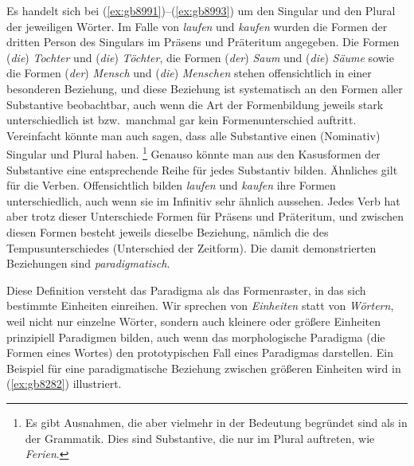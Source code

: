 Es handelt sich bei (\ref{ex:gb8991})--(\ref{ex:gb8993}) um den Singular und den Plural der jeweiligen Wörter.
Im Falle von \textit{laufen} und \textit{kaufen} wurden die Formen der dritten Person des Singulars im Präsens und Präteritum angegeben.
Die Formen (\textit{die}) \textit{Tochter} und (\textit{die}) \textit{Töchter}, die Formen (\textit{der}) \textit{Saum} und (\textit{die}) \textit{Säume} sowie die Formen (\textit{der}) \textit{Mensch} und (\textit{die}) \textit{Menschen} stehen offensichtlich in einer besonderen Beziehung, und diese Beziehung ist systematisch an den Formen aller Substantive beobachtbar, auch wenn die Art der Formenbildung jeweils stark unterschiedlich ist bzw.\ manchmal gar kein Formenunterschied auftritt.
Vereinfacht könnte man auch sagen, dass alle Substantive einen (Nominativ) Singular und Plural haben.%
\footnote{Es gibt Ausnahmen, die aber vielmehr in der Bedeutung begründet sind als in der Grammatik.
Dies sind \zB Substantive, die nur im Plural auftreten, wie \textit{Ferien}.}
Genauso könnte man aus den Kasusformen der Substantive eine entsprechende Reihe für jedes Substantiv bilden.
Ähnliches gilt für die Verben.
Offensichtlich bilden \textit{laufen} und \textit{kaufen} ihre Formen unterschiedlich, auch wenn sie im Infinitiv sehr ähnlich aussehen.
Jedes Verb hat aber trotz dieser Unterschiede Formen für Präsens und Präteritum, und zwischen diesen Formen besteht jeweils dieselbe Beziehung, nämlich die des Tempusunterschiedes (Unterschied der Zeitform).
Die damit demonstrierten Beziehungen sind \textit{paradigmatisch}.


Diese Definition versteht das Paradigma als das Formenraster, in das sich bestimmte Einheiten einreihen.
Wir sprechen von \textit{Einheiten} statt von \textit{Wörtern}, weil nicht nur einzelne Wörter, sondern auch kleinere oder größere Einheiten prinzipiell Paradigmen bilden, auch wenn das morphologische Paradigma (die Formen eines Wortes) den prototypischen Fall eines Paradigmas darstellen.
Ein Beispiel für eine paradigmatische Beziehung zwischen größeren Einheiten wird in (\ref{ex:gb8282}) illustriert.

